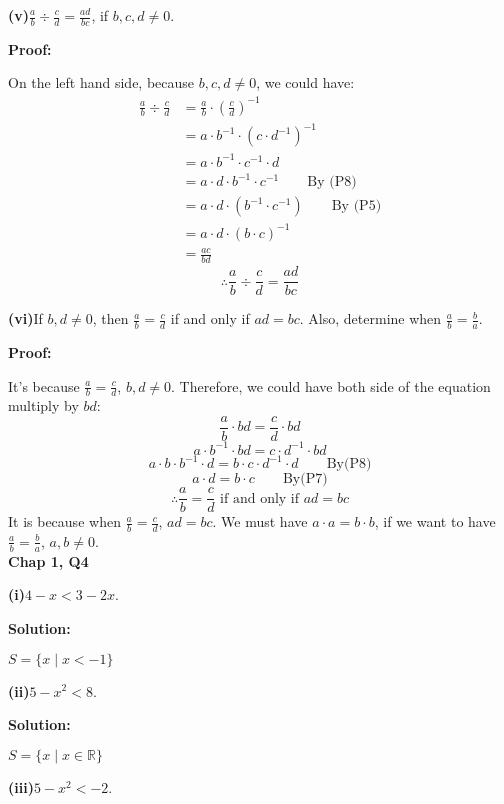 \documentclass[a4paper,12pt]{report}
\begin{document}
\noindent
\textbf{(v)}$\frac{a}{b}\div\frac{c}{d}=\frac{ad}{bc}$, if $b,c,d\neq 0$.

\noindent
\textbf{Proof:}

\noindent
On the left hand side, because $b,c,d\neq 0$, we could have:
\begin{align*}
 \frac{a}{b}\div\frac{c}{d} & =\frac{a}{b} \cdot{(\frac{c}{d})^{-1}} \\
 			   & = a\cdot{b^{-1}}\cdot({c}\cdot{d^{-1}})^{-1} \\
 			   & = a\cdot{b^{-1}}\cdot{c}^{-1}\cdot{d}\\
 			   & = a\cdot{d}\cdot{b^{-1}}\cdot{c}^{-1} \qquad \text{By (P8)}\\
 			   & = a\cdot{d}\cdot({b^{-1}}\cdot{c}^{-1}) \qquad \text{By (P5)}\\
 			   & = a\cdot{d}\cdot({b}\cdot{c})^{-1} \\
 			   & = \frac{ac}{bd}
\end{align*}
\[\therefore \frac{a}{b}\div\frac{c}{d}=\frac{ad}{bc} \]

\noindent
\textbf{(vi)}If $b,d \neq 0$, then $\frac{a}{b}=\frac{c}{d}$ if and only if $ad=bc$. Also, determine when $\frac{a}{b}=\frac{b}{a}$.

\noindent
\textbf{Proof:}

\noindent
It's because $\frac{a}{b}=\frac{c}{d}$, $b,d \neq 0$. Therefore, we could have both side of the equation multiply by $bd$:
\[\frac{a}{b}\cdot{bd}=\frac{c}{d}\cdot{bd}\]
\[a\cdot{b^{-1}}\cdot{bd}=c\cdot{d^{-1}}\cdot{bd}\]
\[a\cdot{b}\cdot{b^{-1}}\cdot{d}=b\cdot{c}\cdot{d^{-1}}\cdot{d} \qquad \text{By(P8)}\]
\[a\cdot{d}=b\cdot{c} \qquad \text{By(P7)}\]
\[\therefore \frac{a}{b}=\frac{c}{d} \text{ if and only if } ad=bc\]
It is because when $\frac{a}{b}=\frac{c}{d}$, $ad=bc$. We must have $a\cdot{a}=b\cdot{b}$, if we want to have $\frac{a}{b}=\frac{b}{a}$, $a,b\neq 0$.\\

\noindent
\textbf{Chap 1, Q4} 

\noindent
\textbf{(i)}$4-x<3-2x$.

\noindent
\textbf{Solution:}

\noindent
$S=\{x \mid x <-1\}$

\noindent
\textbf{(ii)}$5-x^2<8$.

\noindent
\textbf{Solution:}

\noindent
$S=\{x \mid x \in \mathbb{R}\}$

\noindent
\textbf{(iii)}$5-x^2<-2$.
\end{document}
